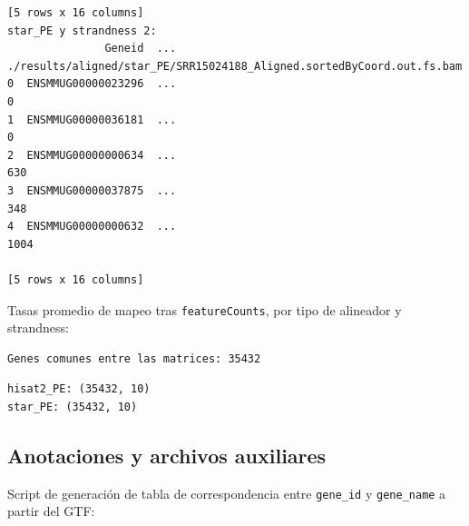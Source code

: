 \documentclass[
  12pt,
  letterpaper,
  DIV=11,
  numbers=noendperiod]{scrartcl}
\begin{document}
\begin{verbatim}
[5 rows x 16 columns]
star_PE y strandness 2:
               Geneid  ... ./results/aligned/star_PE/SRR15024188_Aligned.sortedByCoord.out.fs.bam
0  ENSMMUG00000023296  ...                                                  0                    
1  ENSMMUG00000036181  ...                                                  0                    
2  ENSMMUG00000000634  ...                                                630                    
3  ENSMMUG00000037875  ...                                                348                    
4  ENSMMUG00000000632  ...                                               1004                    

[5 rows x 16 columns]
\end{verbatim}

Tasas promedio de mapeo tras \texttt{featureCounts}, por tipo de
alineador y strandness:

\begin{table}[H]

\caption{\label{tbl-fc-mapping-rates}Tasas de mapeo promedio obtenidas
con \texttt{featureCounts} para cada alineador y tipo de strandness.}


\end{table}%

\begin{verbatim}
Genes comunes entre las matrices: 35432
\end{verbatim}

\begin{verbatim}
hisat2_PE: (35432, 10)
star_PE: (35432, 10)
\end{verbatim}

\subsection{Anotaciones y archivos
auxiliares}\label{anotaciones-y-archivos-auxiliares-1}

Script de generación de tabla de correspondencia entre \texttt{gene\_id}
y \texttt{gene\_name} a partir del GTF:
\end{document}
